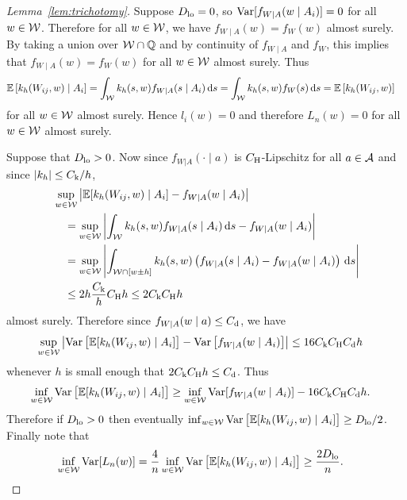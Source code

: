 \begin{proof}[Lemma~\ref{lem:trichotomy}]


  Suppose
  $D_{\textup{lo}} = 0$, so
  $\operatorname{Var}[f_{W \mid A}(w \mid A_i)] = 0$
  for all $w \in \mathcal{W}$.
  Therefore for all $w \in \mathcal{W}$,
  we have $f_{W \mid A}(w) = f_W(w)$ almost surely.
  By taking a union over $\mathcal{W} \cap \mathbb{Q}$
  and by continuity of $f_{W \mid A}$ and $f_W$,
  this implies that $f_{W \mid A}(w) = f_W(w)$
  for all $w \in \mathcal{W}$
  almost surely. Thus
  \begin{align*}
    \mathbb{E}\left[
      k_h(W_{ij},w) \mid A_i
    \right]
    &=
    \int_{\mathcal{W}}
    k_h(s,w)
    f_{W \mid A}(s \mid A_i)
    \,\mathrm{d}s
    =
    \int_{\mathcal{W}}
    k_h(s,w)
    f_W(s)
    \,\mathrm{d}s
    =
    \mathbb{E}\left[
      k_h(W_{ij},w)
    \right]
  \end{align*}
  for all $w \in \mathcal{W}$
  almost surely.
  Hence $l_i(w) = 0$
  and therefore $L_n(w) = 0$
  for all $w \in \mathcal{W}$ almost surely.


  Suppose that $D_{\textup{lo}} > 0$.
  Now since $f_{W|A}(\cdot \mid a)$ is $C_\mathrm{H}$-Lipschitz
  for all $a \in \mathcal{A}$
  and since $|k_h| \leq C_\mathrm{k}/h$,
  \begin{align*}
    &\sup_{w \in \mathcal{W}}
    \left|
    \mathbb{E}[k_h(W_{ij},w) \mid A_i]
    - f_{W \mid A}(w \mid A_i)
    \right| \\
    &\quad=
    \sup_{w \in \mathcal{W}}
    \left|
    \int_{\mathcal{W}}
    k_h(s,w)
    f_{W \mid A}(s \mid A_i)
    \,\mathrm{d}s
    - f_{W \mid A}(w \mid A_i)
    \right| \\
    &\quad=
    \sup_{w \in \mathcal{W}}
    \left|
    \int_{\mathcal{W} \cap [w \pm h]}
    k_h(s,w)
    \left(
      f_{W \mid A}(s \mid A_i)
      - f_{W \mid A}(w \mid A_i)
    \right)
    \,\mathrm{d}s
    \right| \\
    &\quad\leq
    2h
    \frac{C_\mathrm{k}}{h}
    C_\mathrm{H} h
    \leq
    2 C_\mathrm{k} C_\mathrm{H} h
  \end{align*}
  almost surely.
  Therefore since $f_{W \mid A}(w \mid a) \leq C_\mathrm{d}$,
  we have
  \begin{align*}
    \sup_{w \in \mathcal{W}}
    \left|
    \operatorname{Var}\big[
      \mathbb{E}[k_h(W_{ij},w) \mid A_i]
      \big]
    - \operatorname{Var}\left[
      f_{W \mid A}(w \mid A_i)
    \right]
    \right|
    &\leq
    16 C_\mathrm{k} C_\mathrm{H} C_\mathrm{d} h
  \end{align*}
  whenever $h$ is small enough that
  $2 C_\mathrm{k} C_\mathrm{H} h \leq C_\mathrm{d}$. Thus
  \begin{align*}
    \inf_{w \in \mathcal{W}} \operatorname{Var}\big[\mathbb{E}[k_h(W_{ij},w) \mid A_i]\big]
    &\geq
    \inf_{w \in \mathcal{W}}\operatorname{Var}[f_{W \mid A}(w \mid A_i)]
    - 16 C_\mathrm{k} C_\mathrm{H} C_\mathrm{d} h.
  \end{align*}
  Therefore if
  $D_{\textup{lo}} > 0$
  then eventually
  $\inf_{w \in \mathcal{W}} \operatorname{Var}\big[\mathbb{E}[k_h(W_{ij},w) \mid A_i]\big] \geq D_{\textup{lo}}/2$.
  Finally note that
  \begin{align*}
    \inf_{w \in \mathcal{W}}\operatorname{Var}[L_n(w)]
    &=
    \frac{4}{n}
    \inf_{w \in \mathcal{W}}
    \operatorname{Var}\big[\mathbb{E}[k_h(W_{ij},w) \mid A_i]\big]
    \geq
    \frac{2 D_{\textup{lo}}}{n}.
  \end{align*}


\end{proof}
